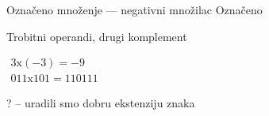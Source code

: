 
\begin{frame}[label=05-s040]{Označeno množenje — negativni množilac}
\fontsize{10}{12}\selectfont
Označeno\par Trobitni operandi, drugi komplement\par $\begin{gathered}3\mathrm{x}(-3)=-9\\011\mathrm{x}101=110111\end{gathered}$
\begin{center}\par\vspace{3mm}\alert{? – uradili smo dobru ekstenziju znaka}\end{center}
\end{frame}
